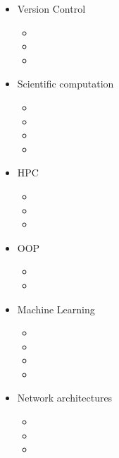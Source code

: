 \documentclass{CurriculumVitae}[10pt, condensed]
\begin{document}
\begin{multicols}{4}
  \begin{itemize}[topsep=0pt]
    \setlength{\itemsep}{-0.3em}
  \item {\footnotesize Version Control}
    \begin{itemize}[topsep=0pt, partopsep=0pt]
      \setlength{\itemsep}{-0.3em}
    \item {}
    \item {}
    \item {}
    \end{itemize}
  \item {\footnotesize Scientific computation}
    \begin{itemize}[topsep=0pt, partopsep=0pt]
      \setlength{\itemsep}{-0.3em}
    \item {}
    \item {}
    \item {}
    \item {}
    \end{itemize}
  \item {\footnotesize HPC}
    \begin{itemize}[topsep=0pt, partopsep=0pt]
      \setlength{\itemsep}{-0.3em}
    \item {}
    \item {}
    \item {}
    \end{itemize}
  \item {\footnotesize OOP}
    \begin{itemize}[topsep=0pt, partopsep=0pt]
      \setlength{\itemsep}{-0.3em}
    \item {}
    \item {}
    \end{itemize}
  \item {\footnotesize Machine Learning}
    \begin{itemize}[topsep=0pt, partopsep=0pt]
      \setlength{\itemsep}{-0.3em}
    \item {}
    \item {}
    \item {}
    \item {}
    \end{itemize}
  \item {\footnotesize Network architectures}
    \begin{itemize}[topsep=0pt, partopsep=0pt]
      \setlength{\itemsep}{-0.3em}
    \item {}
    \item {}
    \item {}
    \end{itemize}
  \end{itemize}
  
\end{multicols}
\end{document}
